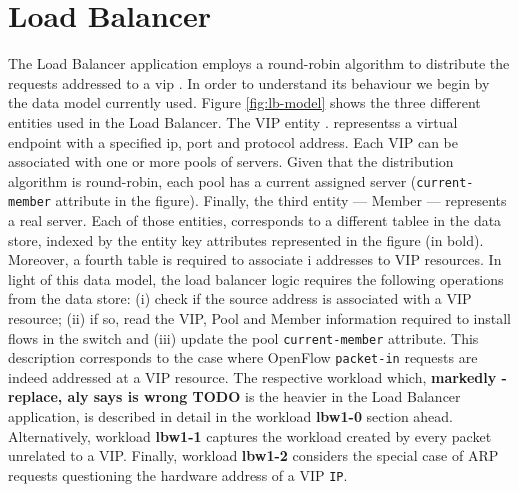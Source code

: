 
\label{cenas}


\section{Load Balancer}
\label{sec:feasibility:lb}
\glsresetall

The Load Balancer application employs a round-robin algorithm to distribute the
requests addressed to a \gls{vip} . In order to
understand its behaviour we begin by the data model currently used. Figure
\ref{fig:lb-model} shows the three different entities used in the Load
Balancer. The  VIP entity .
representss   a virtual endpoint with a specified \gls{ip}, port and
protocol address. Each VIP can be associated with one or more pools
of 
servers. Given that the distribution algorithm is round-robin, each pool
has a current assigned server (\texttt{current-member} attribute in the figure). Finally, the third entity --- Member
--- represents a real server. Each of those entities, corresponds
to a different tablee  in the data store, indexed by the entity
key attributes represented in the figure (in bold). Moreover, a fourth table is
required to associate \gls{i} addresses to VIP resources. In light of
this data model, the load balancer logic requires the following
operations from the data store: (i) check if the source address is
associated with a VIP resource; (ii) if so, read the VIP, Pool and
Member information required to install flows in the switch and (iii)
update the pool \texttt{current-member} attribute. This description corresponds to the case where OpenFlow
\texttt{packet-in} requests are indeed addressed at a VIP
resource. The respective workload which, \textbf{markedly - replace,
  aly says is wrong TODO} is the heavier in
the Load Balancer application, is described in detail in the workload
\textbf{lbw1-0} section ahead. Alternatively, workload
\textbf{lbw1-1} captures the workload created by every
packet unrelated to a VIP. Finally, workload \textbf{lbw1-2}
considers the special case of ARP requests questioning the hardware
address of a VIP \texttt{IP}.

